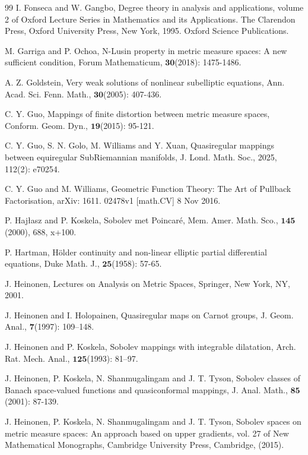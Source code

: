 \documentclass[11pt,twoside]{article}
\theoremstyle{definition}
\theoremstyle{remark}
\begin{document}
\begin{thebibliography}{99}
I. Fonseca and W. Gangbo, Degree theory in analysis and applications, volume 2 of Oxford Lecture Series in Mathematics and its Applications. The Clarendon Press,
 Oxford University Press, New York, 1995. Oxford Science Publications.

M. Garriga and P. Ochoa, N-Lusin property in metric measure spaces: A new sufficient condition, Forum Mathematicum, $\mathbf{30}$(2018): 1475-1486.



A. Z. Goldstein, Very weak solutions of nonlinear subelliptic equations, Ann. Acad. Sci. Fenn. Math., $\mathbf{30}$(2005): 407-436.

C. Y. Guo, Mappings of finite distortion between metric measure spaces, Conform. Geom. Dyn., $\mathbf{19}$(2015): 95-121.

C. Y. Guo, S. N. Golo, M. Williams and Y. Xuan,  Quasiregular mappings between equiregular SubRiemannian manifolds, J. Lond. Math. Soc., 2025, 112(2): e70254.


C. Y. Guo and M.  Williams,  Geometric Function Theory: The Art of Pullback Factorisation, arXiv: 1611. 02478v1  [math.CV]  8 Nov 2016.

P. Hajłasz and P. Koskela, Sobolev met Poincar\'{e}, Mem. Amer. Math. Sco.,  $\mathbf{145}$(2000), 688, x+100.


P. Hartman, H\"{o}lder continuity and non-linear elliptic partial differential equations, Duke Math. J., $\mathbf{25}$(1958): 57-65.

J. Heinonen,  Lectures on Analysis on Metric Spaces, Springer, New York, NY, 2001.



J. Heinonen and I. Holopainen, Quasiregular maps on Carnot groups, J. Geom. Anal., $\mathbf{7}$(1997): 109–148.

J. Heinonen and P. Koskela, Sobolev mappings with integrable dilatation, Arch. Rat. Mech. Anal., $\mathbf{125}$(1993): 81–97.

J. Heinonen, P. Koskela, N. Shanmugalingam and J. T. Tyson, Sobolev classes of Banach space-valued functions and quasiconformal mappings, J. Anal. Math., $\mathbf{85}$(2001): 87-139.

J. Heinonen, P. Koskela, N. Shanmugalingam and J. T. Tyson, Sobolev spaces on metric measure spaces: An approach based on upper gradients, vol. 27 of New Mathematical Monographs, Cambridge University
Press, Cambridge, (2015).



\end{thebibliography}
\end{document}
